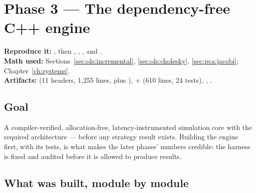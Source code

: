 \section{Phase 3 --- The dependency-free C++ engine}
\label{ch:phase3}

\textbf{Reproduce it:} , then
, , , and
.\\
\textbf{Math used:} Sections~\ref{sec:ols:incremental}, \ref{sec:ols:cholesky},
\ref{sec:pca:jacobi}; Chapter~\ref{ch:systems}.\\
\textbf{Artifacts:}  (11 headers, 1{,}255 lines, plus ),
 +  (610 lines, 24 tests),
, .

\subsection{Goal}

A compiler-verified, allocation-free, latency-instrumented simulation core with the
required architecture --- before any strategy result exists. Building the engine first,
with its tests, is what makes the later phases' numbers credible: the harness is fixed and
audited before it is allowed to produce results.

\subsection{What was built, module by module}


